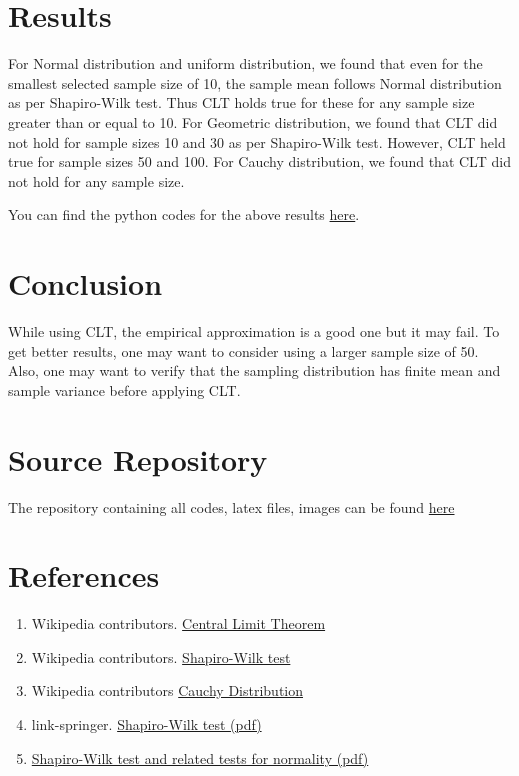 \documentclass{article}
\begin{document}
\section{Results}
For Normal distribution and uniform distribution, we found that even for the smallest selected sample size of 10, the sample mean follows Normal distribution as per Shapiro-Wilk test. Thus CLT holds true for these for any sample size greater than or equal to 10. For Geometric distribution, we found that CLT did not hold for sample sizes 10 and 30 as per Shapiro-Wilk test. However, CLT held true for sample sizes 50 and 100. For Cauchy distribution, we found that CLT did not hold for any sample size. 

\noindent You can find the python codes for the above results 
\href{https://github.com/cmaspi/verifying_CLT/blob/main/codes/visualise_hist.ipynb}{here}.

\section{Conclusion}
While using CLT, the empirical approximation is a good one but it may fail. To get better results, one may want to consider using a larger sample size of 50. Also, one may want to verify that the sampling distribution has finite mean and sample variance before applying CLT.

\section{Source Repository}
The repository containing all codes, latex files, images can be found \href{https://github.com/cmaspi/verifying_CLT}{here}

\section{References}
\begin{enumerate}
    \item Wikipedia contributors. \href{https://en.wikipedia.org/wiki/Central_limit_theorem}{Central Limit Theorem}
    \item Wikipedia contributors. \href{https://en.wikipedia.org/wiki/Shapiro\%E2\%80\%93Wilk_test}{Shapiro-Wilk test}
    \item Wikipedia contributors \href{https://en.wikipedia.org/wiki/Cauchy_distribution}{Cauchy Distribution}
    \item link-springer. \href{https://link.springer.com/content/pdf/bbm\%3A978-1-4684-0167-7\%2F1.pdf}{Shapiro-Wilk test (pdf)}
    \item \href{https://math.mit.edu/~rmd/465/shapiro.pdf}{Shapiro-Wilk test and related tests for normality (pdf)}
\end{enumerate}
\end{document}
